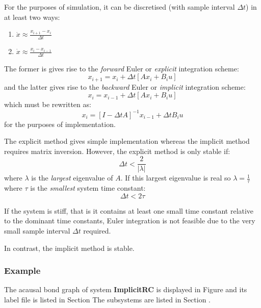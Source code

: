 For the purposes of simulation, it can be discretised (with sample
interval $\Delta t$) in at least two
ways:
\begin{enumerate}
\item $ \dot x \approx \frac{x_{i+1} - x_{i}}{\Delta t}$
\item $ \dot x \approx \frac{x_{i} - x_{i-1}}{\Delta t}$
\end{enumerate}
The former is gives rise to the \emph{forward} Euler or \emph{explicit}
integration scheme:
\begin{equation}
   x_{i+1} =  x_{i} + \Delta t \left [ A x_{i} + B_{i} u \right ]
\end{equation}
and the latter gives rise to the \emph{backward} Euler or \emph{implicit}
integration scheme:
\begin{equation}
   x_{i} =  x_{i-1} + \Delta t \left [ A x_{i} + B_{i} u \right ]
\end{equation}
which must be rewritten as:
\begin{equation}
   x_{i} =   \left [ I -  \Delta t A \right ]^{-1} x_{i-1} + \Delta t  B_{i} u
\end{equation}
for the purposes of implementation.

The explicit method gives simple implementation whereas the implicit
method requires matrix inversion. However, the explicit method is only
stable if:
\begin{equation}
  \Delta t < \frac{2}{| \lambda |}
\end{equation}
where $\lambda$ is the \emph{largest} eigenvalue of $A$. If this
largest eigenvalue is real so $\lambda = \frac{1}{\tau}$ where $\tau$
is the \emph{smallest} system time constant:
\begin{equation}
  \Delta t < 2 \tau
\end{equation}

If the system is stiff, that is it contains at least one small time
constant relative to the dominant time constants, Euler integration is
not feasible due to the very small sample interval $\Delta t$
required.

In contrast, the implicit method is stable.


\subsubsection{Example}
   The acausal bond graph of system \textbf{ImplicitRC} is
   displayed in Figure  and its label
   file is listed in Section 
   The subsystems are listed in Section .

